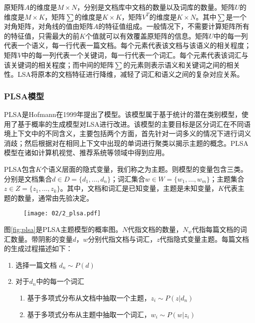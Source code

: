 原矩阵$A$的维度是$M \times N$，分别是文档库中文档的数量以及词库的数量。矩阵$U$的维度是$M \times K$，矩阵$\sum$的维度是$K \times K$，矩阵$V^T$的维度是$K \times N$。其中$\sum$是一个对角矩阵，对角线的值由矩阵$A$的特征值组成。一般情况下，不需要计算矩阵所有的特征值，只需最大的前$K$个值就可以有效覆盖原矩阵的信息。矩阵$U$中的每一列代表一个语义，每一行代表一篇文档。每个元素代表该文档与该语义的相关程度；矩阵$V$中的每一列代表一个关键词，每一行代表一个词汇。每个元素代表该词汇与该关键词的相关程度；而中间的矩阵$\sum$的元素则表示语义和关键词之间的相关性。LSA将原本的文档特征进行降维，减轻了词汇和语义之间的复杂对应关系。

\subsubsection{PLSA模型}
PLSA是Hofmann在1999年提出了模型。该模型属于基于统计的潜在类别模型，使用了基于概率的生成模型对LSA进行改进。该模型的主要目标是区分词汇在不同语境上下文中的不同含义，主要包括两个方面，首先针对一词多义的情况下进行词义消歧；然后根据对在相同上下文中出现的单词进行聚类以揭示主题的概念。PLSA模型在诸如计算机视觉、推荐系统等领域中得到应用。

PLSA包含$K$个语义层面的隐式变量，我们称之为主题。则模型的变量包含三类。分别是文档集合$d \in D = \{d_1, \dots, d_n\}$；词汇集合$w \in W = \{w_1, \dots, w_m\}$；主题集合$z \in Z = \{z_1, \dots, z_k\}$。其中，文档和词汇是已知变量，主题是未知变量，$K$代表主题的数量，通常由先验决定。

\begin{figure}
 \centering
 \texttt{[image: 02/2\_plsa.pdf]}
\end{figure}

图\ref{fig:plsa}是PLSA主题模型的概率图。$N$代指文档的数量，$N_w$代指每篇文档的词汇数量。带阴影的变量$d$，$w$分别代指文档与词汇，$z$代指隐式变量主题。每篇文档的生成过程描述如下：

\begin{enumerate}
\item 选择一篇文档 $d_n \sim P(d)$
\item 对于$d_n$中的每一个词汇
       \begin{enumerate}[fullwidth,itemindent=1em,label=(\alph*)]
       \item 基于多项式分布从文档中抽取一个主题，$z_i \sim P(z|d_n)$
       \item 基于多项式分布从主题中抽取一个词汇，$w_i \sim P(w|z_i)$
       \end{enumerate}
\end{enumerate}


